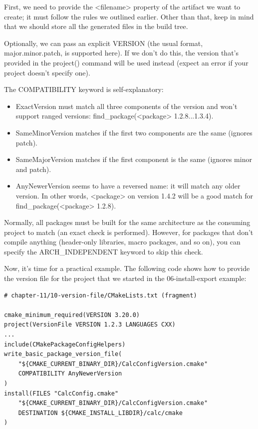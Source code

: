First, we need to provide the <filename> property of the artifact we want to create; it must follow the rules we outlined earlier. Other than that, keep in mind that we should store all the generated files in the build tree.

Optionally, we can pass an explicit VERSION (the usual format, major.minor.patch, is supported here). If we don't do this, the version that's provided in the project() command will be used instead (expect an error if your project doesn't specify one).

The COMPATIBILITY keyword is self-explanatory:

\begin{itemize}
\item 
ExactVersion must match all three components of the version and won't support ranged versions: find\_package(<package> 1.2.8...1.3.4).

\item 
SameMinorVersion matches if the first two components are the same (ignores patch).

\item 
SameMajorVersion matches if the first component is the same (ignores minor and patch).

\item 
AnyNewerVersion seems to have a reversed name: it will match any older version. In other words, <package> on version 1.4.2 will be a good match for find\_package(<package> 1.2.8).
\end{itemize}

Normally, all packages must be built for the same architecture as the consuming project to match (an exact check is performed). However, for packages that don't compile anything (header-only libraries, macro packages, and so on), you can specify the ARCH\_INDEPENDENT keyword to skip this check.

Now, it's time for a practical example. The following code shows how to provide the version file for the project that we started in the 06-install-export example:

\begin{lstlisting}[style=styleCMake]
# chapter-11/10-version-file/CMakeLists.txt (fragment)

cmake_minimum_required(VERSION 3.20.0)
project(VersionFile VERSION 1.2.3 LANGUAGES CXX)
...
include(CMakePackageConfigHelpers)
write_basic_package_version_file(
	"${CMAKE_CURRENT_BINARY_DIR}/CalcConfigVersion.cmake"
	COMPATIBILITY AnyNewerVersion
)
install(FILES "CalcConfig.cmake"
	"${CMAKE_CURRENT_BINARY_DIR}/CalcConfigVersion.cmake"
	DESTINATION ${CMAKE_INSTALL_LIBDIR}/calc/cmake
)
\end{lstlisting}


